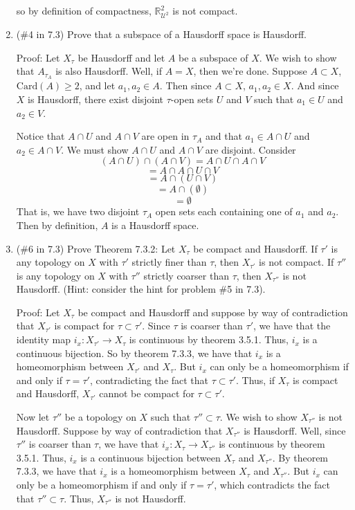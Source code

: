 \documentclass[12pt]{article}
\begin{document}
\begin{enumerate}
so by definition of compactness, $\mathbb{R}^2_{\mathcal{U}^2}$ is not compact.


\item (\#4 in 7.3)  Prove that a subspace of a Hausdorff space is Hausdorff.
\newline

Proof: Let $X_{\tau}$ be Hausdorff and let $A$ be a subspace of $X$. We wish to show that $A_{\tau_A}$ is also Hausdorff. Well, if $A = X$, then we're done. Suppose $A \subset X$, $\text{Card}(A) \geq 2$, and let $a_1, a_2 \in A$. Then since $A \subset X$, $a_1, a_2 \in X$. And since $X$ is Hausdorff, there exist disjoint $\tau$-open sets $U$ and $V$ such that $a_1 \in U$ and $a_2 \in V$. 

Notice that $A \cap U$ and $A \cap V$ are open in $\tau_A$ and that $a_1 \in A \cap U$ and $a_2 \in A \cap V$. We must show $A \cap U$ and $A \cap V$ are disjoint. Consider 
\[(A \cap U) \cap (A \cap V) = A \cap U \cap A \cap V\]
\[ = A \cap A \cap U \cap V\]
\[ = A \cap (U \cap V)\]
\[ = A \cap (\emptyset)\]
\[ = \emptyset\]
That is, we have two disjoint $\tau_A$ open sets each containing one of $a_1$ and $a_2$. Then by definition, $A$ is a Hausdorff space.
\newline

\item (\#6 in 7.3) Prove Theorem 7.3.2: Let $X_{\tau}$ be compact and Hausdorff. If $\tau'$ is any topology on $X$ with $\tau'$ strictly finer than $\tau$, then $X_{\tau'}$ is not compact. If $\tau''$ is any topology on $X$ with $\tau''$ strictly coarser than $\tau$, then $X_{\tau''}$ is not Hausdorff. (Hint: consider the hint for problem \#5 in 7.3).
\newline

Proof:  Let $X_{\tau}$ be compact and Hausdorff and suppose by way of contradiction that $X_{\tau'}$ is compact for $\tau \subset \tau'$. Since $\tau$ is coarser than $\tau'$, we have that the identity map $i_x: X_{\tau'} \to X_{\tau}$ is continuous by theorem 3.5.1.
Thus, $i_x$ is a continuous bijection. So by theorem 7.3.3, we have that $i_x$ is a homeomorphism between $X_{\tau'}$ and $X_{\tau}$. 
But $i_x$ can only be a homeomorphism if and only if $\tau = \tau'$, contradicting the fact that $\tau \subset \tau'$. 
Thus, if $X_{\tau}$ is compact and Hausdorff, $X_{\tau'}$ cannot be compact for $\tau \subset \tau'$.
\newline

Now let $\tau''$ be a topology on $X$ such that $\tau'' \subset \tau$. We wish to show $X_{\tau''}$ is not Hausdorff. Suppose by way of contradiction that $X_{\tau''}$ is Hausdorff. Well, since $\tau''$ is coarser than $\tau$, we have that $i_x: X_{\tau} \to X_{\tau''}$ is continuous by theorem 3.5.1. 
Thus, $i_x$ is a continuous bijection between $X_{\tau}$ and $X_{\tau''}$. By theorem 7.3.3, we have that $i_x$ is a homeomorphism between $X_{\tau}$ and $X_{\tau''}$. But $i_x$ can only be a homeomorphism if and only if $\tau = \tau'$, which contradicts the fact that $\tau'' \subset \tau$. Thus, $X_{\tau''}$ is not Hausdorff.
\newline



\end{enumerate}
\end{document}
